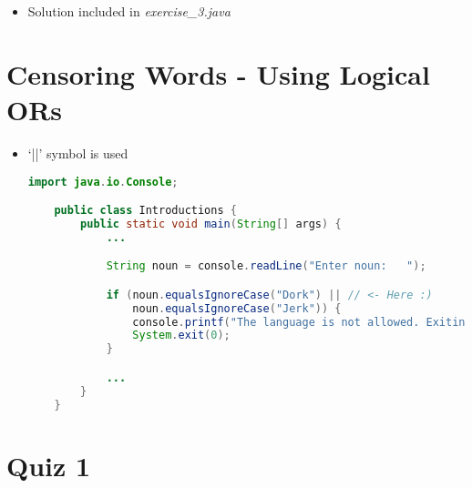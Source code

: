 \documentclass[12pt]{article}
\begin{document}
\bigskip

\begin{itemize}
    \item Solution included in \textit{exercise\_3.java}
\end{itemize}

\bigskip

\section{Censoring Words - Using Logical ORs}

\bigskip

\begin{itemize}
    \item `||' symbol is used

    \begin{lstlisting}[language=Java]
    import java.io.Console;

    public class Introductions {
        public static void main(String[] args) {
            ...

            String noun = console.readLine("Enter noun:   ");

            if (noun.equalsIgnoreCase("Dork") || // <- Here :)
                noun.equalsIgnoreCase("Jerk")) {
                console.printf("The language is not allowed. Exiting\n");
                System.exit(0);
            }

            ...
        }
    }
    \end{lstlisting}
\end{itemize}

\bigskip

\section{Quiz 1}

\bigskip
\end{document}
